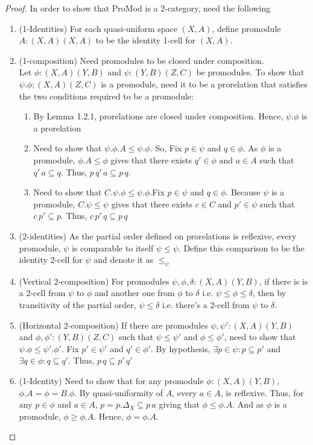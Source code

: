 \documentclass[18pt,a4paper]{article}
\makeatletter
\theoremstyle{definition}
\newcommand{\carrow}{}%
\DeclareRobustCommand{\carrow}{%
	\mathrel{\vphantom{\rightarrow}\mathpalette\circle@arrow\relax}%
}
\newcommand{\circle@arrow}[2]{%
	\m@th
	\ooalign{%
		\hidewidth$#1\circ\mkern1mu$\hidewidth\cr
	$#1\longrightarrow$\cr}%
}
\makeatother
\begin{document}
	\begin{proof} In order to show that ProMod is a 2-category, need the following
		\begin{enumerate}[label=(\alph*)]
			\item (1-Identities) For each quasi-uniform space $(X,A)$,
				define promodule $A:(X,A) \carrow (X,A)$ to be the identity 1-cell for $(X,A)$.
			\item (1-composition) Need promodules to be closed under composition.\\
				Let $\phi:(X,A)\carrow (Y,B)$ and $\psi:(Y,B)\carrow (Z,C)$ be promodules.
				To show that $\psi.\phi:(X,A) \carrow (Z,C)$ is a promodule, need it to be a
				prorelation that satisfies the two conditions required to be a promodule:
				\begin{enumerate}[label=(\roman*)]
					\item By Lemma 1.2.1, prorelations are closed under composition.
						Hence, $\psi.\phi$ is a prorelation
					\item Need to show that $\psi.\phi.A \leq \psi.\phi$. So, Fix
						$p \in \psi$ and $q \in \phi$. As $\phi$ is a promodule,
						$\phi.A\leq \phi$ gives that there exists
						$ q' \in \phi \text{ and } a\in A$ such that
						$q'\,a \subseteq q$. Thus,
						$p\,q'\,a \subseteq p\,q$.
					\item Need to show that $C.\psi.\phi \leq \psi.\phi$.Fix $p \in \psi$
						and $q\in \phi$. Because
						$\psi$ is a promodule, $C.\psi \leq \psi$ gives that
						there exists $c\in C$ and $p' \in \psi$ such that
						$c\,p' \subseteq p$. Thus, $c\,p'\,q \subseteq p\,q$
				\end{enumerate}
			\item (2-identities) As the partial order defined on prorelations is reflexive,
				every promodule, $\psi$ is comparable
				to itself $\psi \leq \psi$. Define this comparison to be the
				identity 2-cell for $\psi$ and denote it as $\leq_\psi$

			\item (Vertical 2-composition) For promodules $\psi,\phi,\delta:(X,A) \carrow (Y,B)$,
				if there is is a 2-cell from $\psi$ to $\phi$ and another one from $\phi$
				to $\delta$ i.e. $\psi \leq \phi \leq \delta$, then by transitivity
				of the partial order, $\psi \leq \delta$ i.e. there's a 2-cell from
				$\psi$ to $\delta$.
			\item (Horizontal 2-composition) If there are promodules
				$\psi,\psi':(X,A) \carrow (Y,B)$ and
				$\phi,\phi':(Y,B) \carrow (Z,C)$ such that $\psi \leq \psi'$ and $\phi \leq
				\phi'$, need to show that $\psi.\phi \leq \psi'.\phi'$. Fix $p' \in \psi'$ and
				$q' \in \phi'$. By hypothesis, $\exists p\in \psi: p \subseteq p'$
				and $\exists q \in \phi: q \subseteq q'$. Thus, $p\,q\subseteq p'\,q'$
			\item (1-Identity) Need to show that for any promodule $\phi:(X,A) \carrow (Y,B)$,
				$\phi.A=\phi=B.\phi$. By quasi-uniformity of $A$, every $a \in A$, is
				reflexive. Thus, for any $p \in \phi$ and $a \in A$,
				$p=p. \Delta_X \subseteq p \,a$
				giving that $\phi \leq \phi.A$. And as $\phi$ is a promodule,
				$\phi \geq \phi.A$. Hence, $\phi=\phi.A$.


\end{enumerate}
\end{proof}
\end{document}
